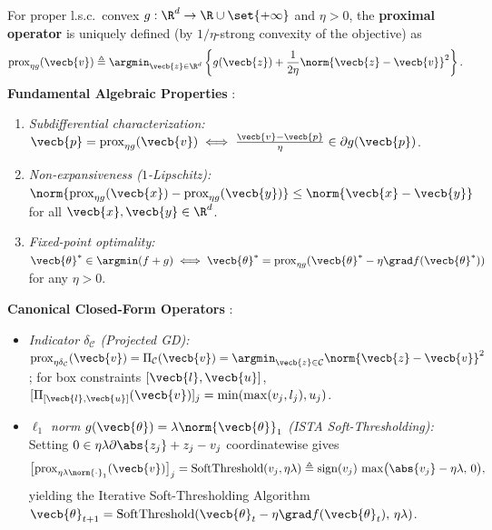 \documentclass[../../../../master.tex]{subfiles}
\begin{document}
\begin{coremath}
For proper l.s.c.\ convex $g : \R^d \to \R \cup \set{+\infty}$ and $\eta > 0$, the \textbf{proximal operator} is uniquely defined (by $1/\eta$-strong convexity of the objective) as
\begin{equation}
\label{eq:sgd:prox-def}
\operatorname{prox}_{\eta g}(\vecb{v}) \triangleq \argmin_{\vecb{z} \in \R^d} \left\{ g(\vecb{z}) + \frac{1}{2\eta}\norm{\vecb{z} - \vecb{v}}^2 \right\}.
\end{equation}
\textbf{Fundamental Algebraic Properties} :
\begin{enumerate}
  \item \emph{Subdifferential characterization:} $\vecb{p} = \operatorname{prox}_{\eta g}(\vecb{v}) \iff \frac{\vecb{v} - \vecb{p}}{\eta} \in \partial g(\vecb{p})$.
  \item \emph{Non-expansiveness ($1$-Lipschitz):} $\norm{\operatorname{prox}_{\eta g}(\vecb{x}) - \operatorname{prox}_{\eta g}(\vecb{y})} \le \norm{\vecb{x} - \vecb{y}}$ for all $\vecb{x}, \vecb{y} \in \R^d$.
  \item \emph{Fixed-point optimality:} $\vecb{\theta}^* \in \argmin(f + g) \iff \vecb{\theta}^* = \operatorname{prox}_{\eta g}(\vecb{\theta}^* - \eta \grad f(\vecb{\theta}^*))$ for any $\eta > 0$.
\end{enumerate}

\textbf{Canonical Closed-Form Operators} :
\begin{itemize}
  \item \emph{Indicator $\delta_{\mathcal{C}}$ (Projected GD):} $\operatorname{prox}_{\eta\delta_{\mathcal{C}}}(\vecb{v}) = \Pi_{\mathcal{C}}(\vecb{v}) = \argmin_{\vecb{z}\in\mathcal{C}}\norm{\vecb{z} - \vecb{v}}^2$; for box constraints $[\vecb{l}, \vecb{u}]$, $[\Pi_{[\vecb{l},\vecb{u}]}(\vecb{v})]_j = \min(\max(v_j, l_j), u_j)$.
  \item \emph{$\ell_1$ norm $g(\vecb{\theta}) = \lambda\norm{\vecb{\theta}}_1$ (ISTA Soft-Thresholding):} Setting $0 \in \eta\lambda\partial\abs{z_j} + z_j - v_j$ coordinatewise gives
  \begin{equation}
  \label{eq:sgd:ista}
  \bigl[\operatorname{prox}_{\eta\lambda\norm{\cdot}_1}(\vecb{v})\bigr]_j
  = \operatorname{SoftThreshold}(v_j, \eta\lambda)
  \triangleq \operatorname{sign}(v_j)\,\max\bigl(\abs{v_j} - \eta\lambda,\, 0\bigr),
  \end{equation}
  yielding the Iterative Soft-Thresholding Algorithm $\vecb{\theta}_{t+1} = \operatorname{SoftThreshold}(\vecb{\theta}_t - \eta\grad f(\vecb{\theta}_t),\, \eta\lambda)$.
\end{itemize}


\end{coremath}
\end{document}
